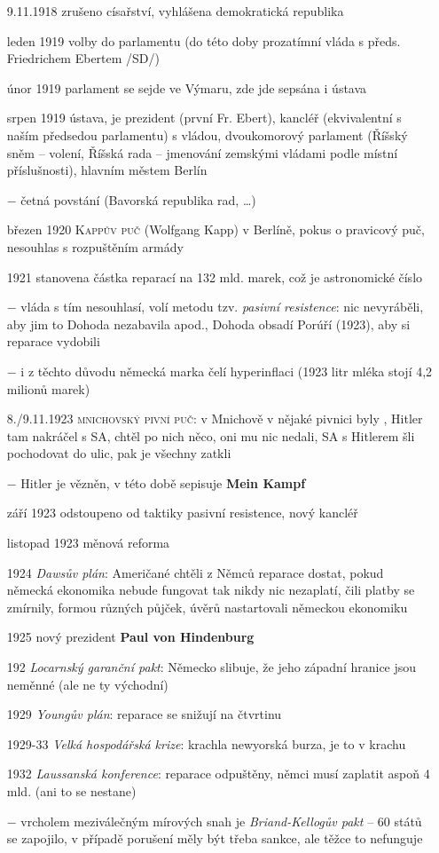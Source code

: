 \documentclass{article}
\begin{document}
\begin{itemize}
  \vspace{-0.5em}
  \setlength\itemsep{0.15em}
  \item[9.11.1918] zrušeno císařství, vyhlášena demokratická republika
  \item[leden 1919] volby do parlamentu (do této doby prozatímní vláda s předs. Friedrichem Ebertem /SD/)
  \item[únor 1919] parlament se sejde ve Výmaru, zde jde sepsána i ústava
  \item[srpen 1919] ústava, je prezident (první Fr. Ebert), kancléř (ekvivalentní s naším předsedou parlamentu) s vládou, dvoukomorový parlament (Říšský sněm -- volení, Říšská rada -- jmenování zemskými vládami podle místní příslušnosti), hlavním městem Berlín
  \item[$-$] četná povstání (Bavorská republika rad, \dots)
  \item[březen 1920] \textsc{Kappův puč}  (Wolfgang Kapp) v Berlíně, pokus o pravicový puč, nesouhlas s rozpuštěním armády
  \item[1921] stanovena částka reparací na 132 mld. marek, což je astronomické číslo
  \item[$-$] vláda s tím nesouhlasí, volí metodu tzv. \textit{pasivní resistence}:  nic nevyráběli, aby jim to Dohoda nezabavila apod., Dohoda obsadí Porúří (1923), aby si reparace vydobili
  \item[$-$] i z těchto důvodu německá marka čelí hyperinflaci (1923 litr mléka stojí 4,2 milionů marek)
  \item[8./9.11.1923] \textsc{mnichovský pivní puč}: v Mnichově v nějaké pivnici byly , Hitler tam nakráčel s SA, chtěl po nich něco, oni mu nic nedali, SA s Hitlerem šli pochodovat do ulic, pak je všechny zatkli
  \item[$-$] Hitler je vězněn, v této době sepisuje \textbf{Mein Kampf}
  \item[září 1923] odstoupeno od taktiky pasivní resistence, nový kancléř
  \item[listopad 1923] měnová reforma
  \item[1924] \textit{Dawsův plán}: Američané chtěli z Němců reparace dostat, pokud německá ekonomika nebude fungovat tak nikdy nic nezaplatí, čili platby se zmírnily, formou různých půjček, úvěrů nastartovali německou ekonomiku
  \item[1925] nový prezident \textbf{Paul von Hindenburg}
  \item[192] \textit{Locarnský garanční pakt}: Německo slibuje, že jeho západní hranice jsou neměnné (ale ne ty východní)
  \item[1929] \textit{Youngův plán}: reparace se snižují na čtvrtinu
  \item[1929-33] \textit{Velká hospodářská krize}: krachla newyorská burza, je to v krachu
  \item[1932] \textit{Laussanská konference}: reparace odpuštěny, němci musí zaplatit aspoň 4 mld. (ani to se nestane)
  \item[$-$] vrcholem meziválečným mírových snah je \textit{Briand-Kellogův pakt}  -- 60 států se zapojilo, v případě porušení měly být třeba sankce, ale těžce to nefunguje
\end{itemize}
\end{document}
